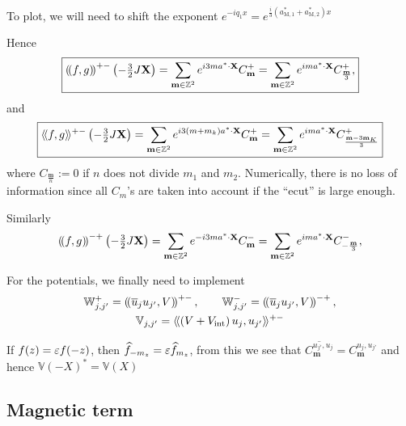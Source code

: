 \documentclass[11pt,a4paper,reqno,french,tikz]{amsart}
\newcommand{\pa}[1]{\left( #1 \right)} %
\newcommand{\f}[2]{\frac{#1}{#2}} %
\newcommand{\ind}[1]{_{\textup{#1}}} %
\newcommand{\bbV}{\mathbb{V}}
\newcommand{\db}[1]{\left(\!\left( #1 \right)\!\right)}
\def\bX{{\mathbf X}}
\def\bmm{{\mathbf m}}
\def\bbV{{\mathbb V}}
\def\bbW{{\mathbb W}}
\def\lAngle{\langle\!\langle}
\def\rAngle{\rangle\!\rangle}
\begin{document}
To plot, we will need to shift the exponent $e^{-iq_1 x} = e^{\f{i}{3}\pa{a_{\text{M},1}^*+a_{\text{M},2}^*}x}$

{\color{red}{TO RECTIFY}}

Hence
\begin{align*}
\boxed{\db{f,g}^{+-}\pa{-\tfrac{3}{2} J \bX} =  \sum_{\bmm \in \Z^2} e^{i 3 ma^* \cdot \bX} C^+_\bmm=  \sum_{\bmm \in \Z^2} e^{i m a^* \cdot \bX} C^+_{\f{\bmm}{3}},}
\end{align*}
and
\begin{align*}
\boxed{\lAngle f,g \rAngle^{+-}\pa{-\tfrac{3}{2} J\bX} =  \sum_{\bmm \in \Z^2} e^{i 3 \pa{m+m_k}a^* \cdot \bX} C^+_\bmm =  \sum_{\bmm \in \Z^2} e^{i m a^* \cdot \bX} C^+_{\f{\bmm-3\bmm_K}{3}}}
\end{align*}
where $C_{\f{\bmm}{n}} := 0$ if $n$ does not divide $m_1$ and $m_2$. Numerically, there is no loss of information since all $C_m$'s are taken into account if the ``ecut'' is large enough.

Similarly
\begin{align*}
\db{f,g}^{-+}\pa{-\tfrac{3}{2} J \bX} =  \sum_{\bmm \in \Z^2} e^{-i 3 ma^* \cdot \bX} C^-_\bmm=  \sum_{\bmm \in \Z^2} e^{i m a^* \cdot \bX} C^-_{-\f{\bmm}{3}},
\end{align*}

For the potentials, we finally need to implement
\begin{multline*}
\bbW_{j,j'}^+ = \db{\overline{u}_j u_{j'}, V}^{+-}, \qquad \bbW_{j,j'}^- = \db{\overline{u}_j u_{j'}, V}^{-+},\\
\bbV_{j,j'} = \lAngle \pa{V+V\ind{int}} u_j , u_{j'} \rAngle^{+-}
\end{multline*}


If $f(z) = \varepsilon f(-z)$, then $\widehat{f}_{-m_z} = \varepsilon \widehat{f}_{m_z}$, from this we see that $\overline{C_\bmm^{u_{j'},u_{j}}} = C_\bmm^{u_{j},u_{j'}}$ and hence $\bbV(-X)^* = \bbV(X)$


\subsection{Magnetic term}%
\end{document}
